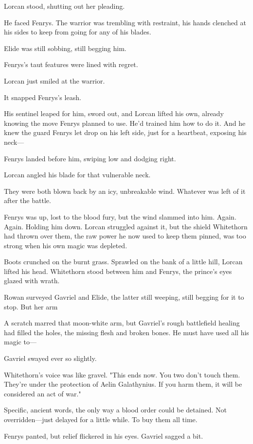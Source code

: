 Lorcan stood, shutting out her pleading.

He faced Fenrys. The warrior was trembling with restraint, his hands clenched at his sides to keep from going for any of his blades.

Elide was still sobbing, still begging him.

Fenrys's taut features were lined with regret.

Lorcan just smiled at the warrior.

It snapped Fenrys's leash.

His sentinel leaped for him, sword out, and Lorcan lifted his own, already knowing the move Fenrys planned to use. He'd trained him how to do it. And he knew the guard Fenrys let drop on his left side, just for a heartbeat, exposing his neck---

Fenrys landed before him, swiping low and dodging right.

Lorcan angled his blade for that vulnerable neck.

They were both blown back by an icy, unbreakable wind. Whatever was left of it after the battle.

Fenrys was up, lost to the blood fury, but the wind slammed into him. Again. Again. Holding him down. Lorcan struggled against it, but the shield Whitethorn had thrown over them, the raw power he now used to keep them pinned, was too strong when his own magic was depleted.

Boots crunched on the burnt grass. Sprawled on the bank of a little hill, Lorcan lifted his head. Whitethorn stood between him and Fenrys, the prince's eyes glazed with wrath.

Rowan surveyed Gavriel and Elide, the latter still weeping, still begging for it to stop. But her arm 

A scratch marred that moon-white arm, but Gavriel's rough battlefield healing had filled the holes, the missing flesh and broken bones. He must have used all his magic to---

Gavriel swayed ever so slightly.

Whitethorn's voice was like gravel. "This ends now. You two don't touch them. They're under the protection of Aelin Galathynius. If you harm them, it will be considered an act of war."

Specific, ancient words, the only way a blood order could be detained. Not overridden---just delayed for a little while. To buy them all time.

Fenrys panted, but relief flickered in his eyes. Gavriel sagged a bit.

